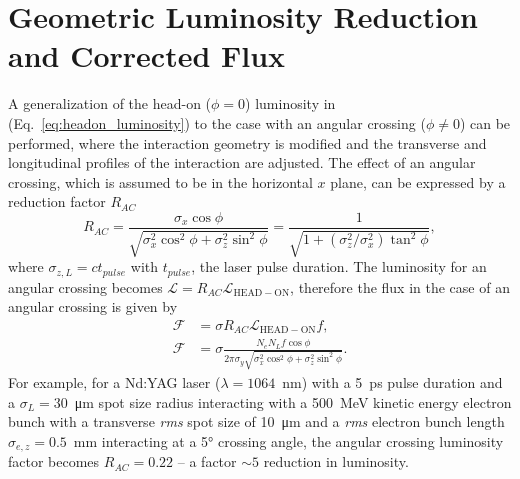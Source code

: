 \documentclass[../main.tex]{subfiles}
\begin{document}
\section{Geometric Luminosity Reduction and Corrected Flux}
\label{sec:geometric_luminosity_reduction}

A generalization of the head-on ($\phi = 0$) luminosity in (Eq.~\ref{eq:headon_luminosity}) to the case with an angular crossing ($\phi \neq 0$) can be performed, where the interaction geometry is modified and the transverse and longitudinal profiles of the interaction are adjusted. The effect of an angular crossing, which is assumed to be in the horizontal $x$ plane, can be expressed by a reduction factor $R_{AC}$ \cite{suzuki1976general,miyahara2008luminosity}
\begin{equation}
R_{AC} = \frac{\sigma_{x}\cos\phi}{\sqrt{\sigma_{x}^{2}\cos^{2}\phi+\sigma_{z}^{2}\sin^{2}\phi}} = \frac{1}{\sqrt{1+\left(\sigma_{z}^{2}/\sigma_{x}^{2}\right)\tan^{2}\phi}},
\label{eq:angular_crossing_factor}    
\end{equation}
where $\sigma_{z,L} = ct_{pulse}$ with $t_{pulse}$, the laser pulse duration. The luminosity for an angular crossing becomes $\mathcal{L} = R_{AC}\mathcal{L}_{\mathrm{HEAD-ON}}$, therefore the flux in the case of an angular crossing is given by 
\begin{align}
\mathcal{F} &= \sigma R_{AC}\mathcal{L}_{\mathrm{HEAD-ON}}f, \nonumber\\
\mathcal{F} &= \sigma\frac{N_{e}N_{L}f\cos\phi}{2\pi\sigma_{y}\sqrt{\sigma_{x}^{2}\cos^{2}\phi + \sigma_{z}^{2}\sin^{2}\phi}}.
\label{eq:crossing_angle_flux}    
\end{align}
For example, for a Nd:YAG laser ($\lambda = 1064$~\si{\nano\meter}) with a 5~\si{\pico\second} pulse duration and a $\sigma_{L} = 30$~\si{\micro\meter} spot size radius interacting with a 500~\si{\mega\electronvolt} kinetic energy electron bunch with a transverse \textit{rms} spot size of 10~\si{\micro\meter} and a \textit{rms} electron bunch length $\sigma_{e,z} = 0.5$~\si{\milli\meter} interacting at a 5\si{\degree} crossing angle, the angular crossing luminosity factor becomes $R_{AC} = 0.22$ -- a factor $\sim5$ reduction in luminosity.
\end{document}
